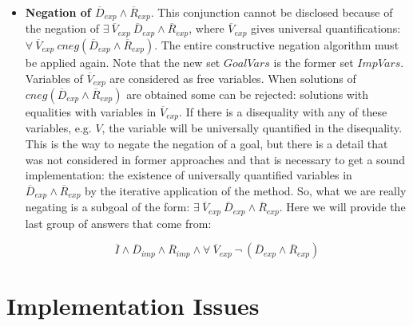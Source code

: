 \documentclass{llncs}
\begin{document}
\begin{itemize}
           \item {\bf Negation of $\overline{D}_{exp} \wedge
           \overline{R}_{exp}$}. This conjunction cannot be disclosed
           because of the negation of $ \exists~ \overline{V}_{exp}~
           \overline{D}_{exp} \wedge \overline{R}_{exp}$, where
           $\overline{V}_{exp}$ gives universal quantifications:\\
           $\forall~ \overline{V}_{exp}~ cneg(\overline{D}_{exp}
           \wedge \overline{R}_{exp})$. The entire constructive
           negation algorithm must be applied again. Note that the new
           set $GoalVars$ is the former set $ImpVars$. Variables of
           $\overline{V}_{exp}$ are considered as free variables. When
           solutions of $cneg(\overline{D}_{exp} \wedge
           \overline{R}_{exp})$ are obtained some can be rejected:
           solutions with equalities with variables in
           $\overline{V}_{exp}$. If there is a disequality with any of
           these variables, e.g. $V$, the variable will be universally
           quantified in the disequality.  This is the way to negate
           the negation of a goal, but there is a detail that was not
           considered in former approaches and that is necessary to
           get a sound implementation: the existence of universally
           quantified variables in $\overline{D}_{exp} \wedge
           \overline{R}_{exp}$ by the iterative application of the
           method.  So, what we are really negating is a subgoal of
           the form: $ \exists~ \overline{V}_{exp}~ \overline{D}_{exp}
           \wedge \overline{R}_{exp}$.  Here we will provide the last
           group of answers that come from:

           \[\overline{I} \wedge \overline{D}_{imp}
           \wedge \overline{R}_{imp} \wedge \forall~
           \overline{V}_{exp}~ \neg~(\overline{D}_{exp} \wedge
           \overline{R}_{exp})\]

         \end{itemize}


    


\section{Implementation Issues}
\label{implementation}
\end{document}
